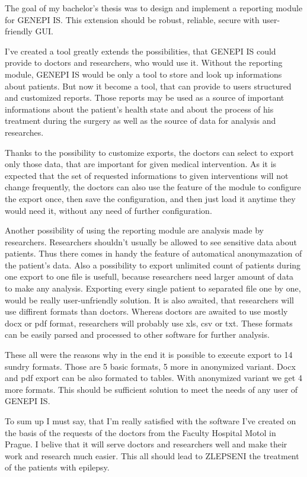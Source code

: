 \documentclass[thesis=B,english]{FITthesis}[2012/10/20]
\begin{document}
\begin{conclusion}
The goal of my bachelor's thesis was to design and implement a reporting module for GENEPI IS. This extension should be robust, reliable, secure with user-friendly GUI.

I've created a tool greatly extends the possibilities, that GENEPI IS could provide to doctors and researchers, who would use it. Without the reporting module, GENEPI IS would be only a tool to store and look up informations about patients. But now it become a tool, that can provide to users structured and customized reports. Those reports may be used as a source of important informations about the patient's health state and about the process of his treatment during the surgery as well as the source of data for analysis and researches.

Thanks to the possibility to customize exports, the doctors can select to export only those data, that are important for given medical intervention. As it is expected that the set of requested informations to given interventions will not change frequently, the doctors can also use the feature of the module to configure the export once, then save the configuration, and then just load it anytime they would need it, without any need of further configuration.

Another possibility of using the reporting module are analysis made by researchers. Researchers shouldn't usually be allowed to see sensitive data about patients. Thus there comes in handy the feature of automatical anonymazation of the patient's data. Also a possibility to export unlimited count of patients during one export to one file is usefull, because researchers need larger amount of data to make any analysis. Exporting every single patient to separated file one by one, would be really user-unfriendly solution. It is also awaited, that researchers will use diffirent formats than doctors. Whereas doctors are awaited to use mostly docx or pdf format, researchers will probably use xls, csv or txt. These formats can be easily parsed and processed to other software for further analysis.

These all were the reasons why in the end it is possible to execute export to 14 sundry formats. Those are 5 basic formats, 5 more in anonymized variant. Docx and pdf export can be also formated to tables. With anonymized variant we get 4 more formats. This should be sufficient solution to meet the needs of any user of GENEPI IS.

To sum up I must say, that I'm really satisfied with the software I've created on the basis of the requests of the doctors from the Faculty Hospital Motol in Prague. I belive that it will serve doctors and researchers well and make their work and research much easier. This all should lead to ZLEPSENI the treatment of the patients with epilepsy.


\end{conclusion}
\end{document}
